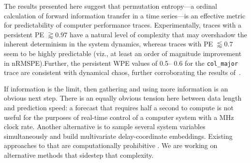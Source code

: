 The results presented here suggest that permutation entropy---a ordinal
calculation of forward information transfer in a time series---is an effective
metric for predictability of computer performance traces. Experimentally, traces
with a persistent PE $\gtrapprox 0.97$ have a natural level of complexity that
may overshadow the inherent determinism in the system dynamics, whereas traces
with PE $\lessapprox 0.7$ seem to be highly predictable (viz., at least an order
of magnitude improvement in nRMSPE).Further, the persistent WPE values of 0.5--
0.6 for the {\tt col\_major} trace are consistent with dynamical chaos, further
corroborating the results of~\cite{mytkowicz09}.

If information is the limit, then gathering and using more information is an
obvious next step.  There is an equally obvious tension here between data length
and prediction speed: a forecast that requires half a second to compute is not
useful for the purposes of real-time control of a computer system with a MHz
clock rate.  Another alternative is to sample several system variables
simultaneously and build multivariate delay-coordinate embeddings.  Existing
approaches to that are computationally prohibitive
\cite{cao-multivariate-embedding}.  We are working on alternative
methods that sidestep that complexity.





